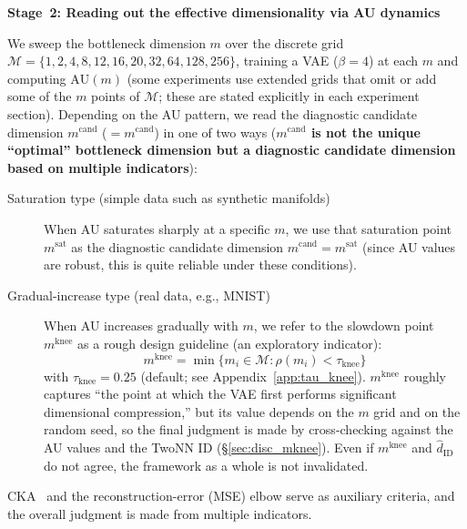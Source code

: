 \documentclass[make,article,submit,pdftex,moreauthors]{Definitions/mdpi}
\newcommand{\dzopt}{m^{\mathrm{cand}}}
\newcommand{\dzsat}{m^{\mathrm{sat}}}
\newcommand{\mknee}{m^{\mathrm{knee}}}
\begin{document}
\textbf{Stage~2: Reading out the effective dimensionality via AU dynamics}

We sweep the bottleneck dimension $m$ over the discrete grid
$\mathcal{M} = \{1, 2, 4, 8, 12,\allowbreak 16, 20, 32,\allowbreak 64, 128, 256\}$,
training a VAE ($\beta = 4$) at each $m$ and computing $\mathrm{AU}(m)$
(some experiments use extended grids that omit or add some of the $m$ points of
$\mathcal{M}$; these are stated explicitly in each experiment section).
Depending on the AU pattern, we read the diagnostic candidate dimension
$\dzopt$ ($= m^{\mathrm{cand}}$) in one of two ways
(\textbf{$\dzopt$ is not the unique ``optimal'' bottleneck dimension but a
diagnostic candidate dimension based on multiple indicators}):

\begin{description}
  \item[Saturation type (simple data such as synthetic manifolds)]
        When AU saturates sharply at a specific $m$, we use that saturation point
        $\dzsat$ as the diagnostic candidate dimension $\dzopt = \dzsat$
        (since AU values are robust, this is quite reliable under these
        conditions).
  \item[Gradual-increase type (real data, e.g., MNIST)]
        When AU increases gradually with $m$, we refer to the slowdown point
        $\mknee$ as a rough design guideline (an exploratory indicator):
        \begin{equation}
          \mknee = \min\{m_i \in \mathcal{M} : \rho(m_i) < \tau_{\mathrm{knee}}\}
          \label{eq:mknee}
        \end{equation}
        with $\tau_{\mathrm{knee}} = 0.25$ (default; see Appendix~\ref{app:tau_knee}).
        $\mknee$ roughly captures ``the point at which the VAE first performs
        significant dimensional compression,'' but its value depends on the $m$
        grid and on the random seed, so the final judgment is made by
        cross-checking against the AU values and the TwoNN ID
        (§\ref{sec:disc_mknee}).
        Even if $\mknee$ and $\hat{d}_\mathrm{ID}$ do not agree, the framework as a
        whole is not invalidated.
\end{description}

CKA~\cite{kornblith2019cka} and the reconstruction-error (MSE) elbow serve as
auxiliary criteria, and the overall judgment is made from multiple indicators.
\end{document}
